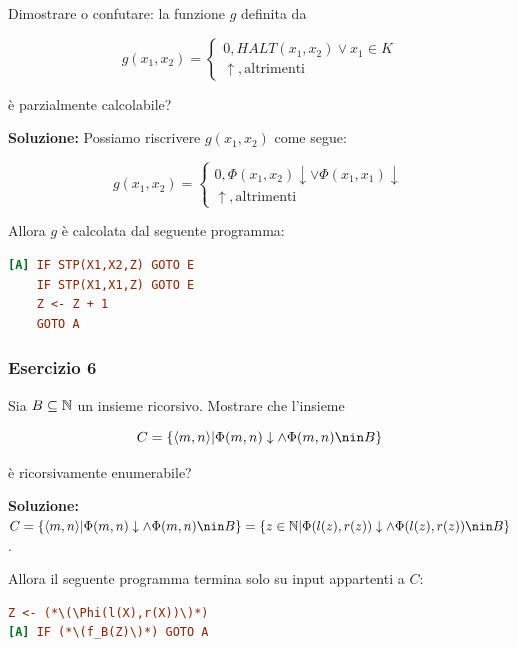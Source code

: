 Dimostrare o confutare: la funzione \(g\) definita da

\begin{equation}
  g(x_1,x_2) = \begin{cases}
    0, \textit{HALT}(x_1,x_2) \lor x_1 \in K\\
    \uparrow, \text{altrimenti}
  \end{cases}
\end{equation}

è parzialmente calcolabile?

\textbf{Soluzione: } Possiamo riscrivere \(g(x_1,x_2)\) come segue:

\begin{equation}
  g(x_1,x_2) = \begin{cases}
    0, \Phi(x_1,x_2) \downarrow \lor \Phi(x_1,x_1) \downarrow\\
    \uparrow, \text{altrimenti}
  \end{cases}
\end{equation}

Allora \(g\) è calcolata dal seguente programma:

\begin{lstlisting}[language=ini, caption={ }]
[A] IF STP(X1,X2,Z) GOTO E
    IF STP(X1,X1,Z) GOTO E
    Z <- Z + 1
    GOTO A
\end{lstlisting}

\subsubsection{Esercizio 6}

Sia \(B \subseteq \mathbb{N}\) un insieme ricorsivo. Mostrare che l'insieme

\begin{equation}
  C = \cbrakets{\abrakets{m,n} \vert \Phi(m,n) \downarrow \land \Phi(m,n) \nin B}
\end{equation}

è ricorsivamente enumerabile?

\textbf{Soluzione: } \(C=\cbrakets{\abrakets{m,n} \vert \Phi(m,n) \downarrow \land \Phi(m,n) \nin B}=\cbrakets{ z \in \mbN \vert \Phi(l(z),r(z)) \downarrow \land \Phi(l(z),r(z)) \nin B}\).

Allora il seguente programma termina solo su input appartenti a \(C\):

\begin{lstlisting}[language=ini, caption={ }]
    Z <- (*\(\Phi(l(X),r(X))\)*)
[A] IF (*\(f_B(Z)\)*) GOTO A
\end{lstlisting}

